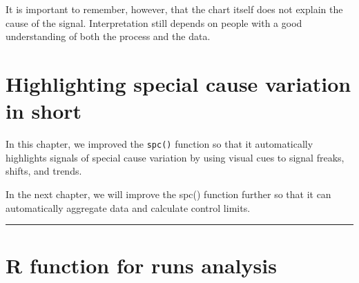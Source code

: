 \documentclass[
]{book}
\begin{document}
It is important to remember, however, that the chart itself does not explain the cause of the signal. Interpretation still depends on people with a good understanding of both the process and the data.

\section{Highlighting special cause variation in short}\label{highlighting-special-cause-variation-in-short}

In this chapter, we improved the \texttt{spc()} function so that it automatically highlights signals of special cause variation by using visual cues to signal freaks, shifts, and trends.

In the next chapter, we will improve the spc() function further so that it can automatically aggregate data and calculate control limits.

\begin{center}\rule{0.5\linewidth}{0.5pt}\end{center}

\section*{R function for runs analysis}\label{r-function-for-runs-analysis}
\end{document}
